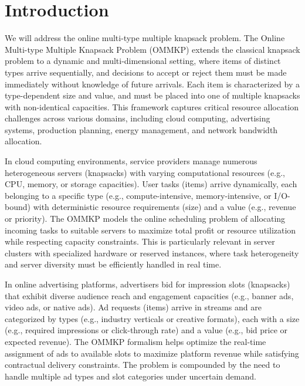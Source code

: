 


\section{Introduction}
We will address the online multi-type multiple knapsack problem. 
The Online Multi-type Multiple Knapsack Problem (OMMKP) extends the classical knapsack problem to a dynamic and multi-dimensional setting, where items of distinct types arrive sequentially, and decisions to accept or reject them must be made immediately without knowledge of future arrivals. Each item is characterized by a type-dependent size and value, and must be placed into one of multiple knapsacks with non-identical capacities. This framework captures critical resource allocation challenges across various domains, including cloud computing, advertising systems, production planning, energy management, and network bandwidth allocation.


In cloud computing environments, service providers manage numerous heterogeneous servers (knapsacks) with varying computational resources (e.g., CPU, memory, or storage capacities). User tasks (items) arrive dynamically, each belonging to a specific type (e.g., compute-intensive, memory-intensive, or I/O-bound) with deterministic resource requirements (size) and a value (e.g., revenue or priority). The OMMKP models the online scheduling problem of allocating incoming tasks to suitable servers to maximize total profit or resource utilization while respecting capacity constraints. This is particularly relevant in server clusters with specialized hardware or reserved instances, where task heterogeneity and server diversity must be efficiently handled in real time.


In online advertising platforms, advertisers bid for impression slots (knapsacks) that exhibit diverse audience reach and engagement capacities (e.g., banner ads, video ads, or native ads). Ad requests (items) arrive in streams and are categorized by types (e.g., industry verticals or creative formats), each with a size (e.g., required impressions or click-through rate) and a value (e.g., bid price or expected revenue). The OMMKP formalism helps optimize the real-time assignment of ads to available slots to maximize platform revenue while satisfying contractual delivery constraints. The problem is compounded by the need to handle multiple ad types and slot categories under uncertain demand.


